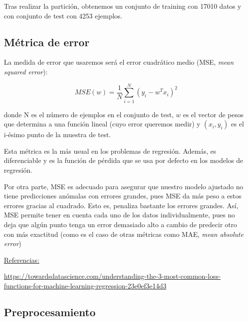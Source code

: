 \documentclass[a4]{article}
\begin{document}
Tras realizar la partición, obtenemos un conjunto de training con 17010 datos y con conjunto de test con 4253 ejemplos. 

\subsection{Métrica de error}

La medida de error que usaremos será el error cuadrático medio (MSE,\textit{ mean squared error}): 

$$MSE(w)=\frac{1}{N}\sum_{i=1}^{N}(y_i-w^Tx_i)^2$$

donde N es el número de ejemplos en el conjunto de test, $w$ es el vector de pesos que determina a una función lineal (cuyo error queremos medir) y $(x_i,y_i)$ es el i-ésimo punto de la muestra de test. 

Esta métrica es la más usual en los problemas de regresión. Además, es diferenciable y es la función de pérdida que se usa por defecto en los modelos de regresión. 

Por otra parte, MSE es adecuado para asegurar que nuestro modelo ajustado no tiene predicciones anómalas con errores grandes, pues MSE da más peso a estos errores gracias al cuadrado. Esto es, penaliza bastante los errores grandes. Así, MSE permite tener en cuenta cada uno de los datos individualmente, pues no deja que algún punto tenga un error demasiado alto a cambio de predecir otro con más exactitud (como es el caso de otras métricas como MAE, \textit{mean absolute error})

\underline{Referencias:}

\href{https://towardsdatascience.com/understanding-the-3-most-common-loss-functions-for-machine-learning-regression-23e0ef3e14d3}{https://towardsdatascience.com/understanding-the-3-most-common-loss-functions-for-machine-learning-regression-23e0ef3e14d3}

\subsection{Preprocesamiento}
\end{document}
